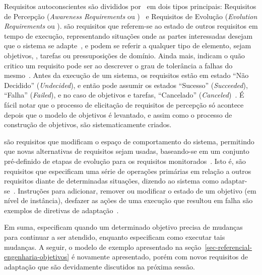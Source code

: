 Requisitos autoconscientes são divididos por~ em dois tipos principais: Requisitos de Percepção (\textit{Awareness Requirements} ou \awreqs)~\cite{souza2013awareness} e Requisitos de Evolução (\textit{Evolution Requirements} ou \evoreqs). \awreqs são requisitos que referem-se ao estado de outros requisitos em tempo de execução, representando situações onde as partes interessadas desejam que o sistema se adapte~\cite{souza2012requirement}, e podem se referir a qualquer tipo de elemento, sejam objetivos, \sofgoals, tarefas ou pressuposições de domínio. Ainda mais, \awreqs indicam o quão critico um requisito pode ser ao descrever o grau de tolerância a falhas do mesmo~\cite{souza2012requirement}. Antes da execução de um sistema, os requisitos estão em estado ``Não Decidido'' (\textit{Undecided}), e então pode assumir os estados ``Sucesso'' (\textit{Succeeded}), ``Falha'' (\textit{Failed}), e no caso de objetivos e tarefas, ``Cancelado'' (\textit{Canceled})~\cite{souza2013awareness}. É fácil notar que o processo de elicitação de requisitos de percepção só acontece depois que o modelo de objetivos é levantado, e assim como o processo de construção de objetivos, \awreqs são sistematicamente criados.

\evoreqs são requisitos que modificam o espaço de comportamento do sistema, permitindo que novas alternativas de requisitos sejam usadas, baseando-se em um conjunto pré-definido de etapas de evolução para os requisitos monitorados~\cite{souza2012requirement}. Isto é, \evoreqs são requisitos que especificam uma série de operações primárias em relação a outros requisitos diante de determinadas situações, dizendo ao sistema como adaptar-se~\cite{souza2012requirement}. Instruções para adicionar, remover ou modificar o estado de um objetivo (em nível de instância), desfazer as ações de uma execução que resultou em falha são exemplos de diretivas de adaptação~\cite{souza2013requirements}.

Em suma, \awreqs especificam quando um determinado objetivo precisa de mudanças para continuar a ser atendido, enquanto \evoreqs especificam como executar tais mudanças. A seguir, o modelo de exemplo apresentado na seção~\ref{sec-referencial-engenharia-objetivos} é novamente apresentado, porém com novos requisitos de adaptação que são devidamente discutidos na próxima sessão.


